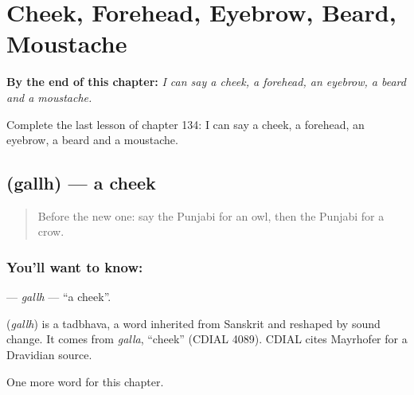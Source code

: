 
\chapter{Cheek, Forehead, Eyebrow, Beard, Moustache}
\label{ch:pa-cheek-forehead-eyebrow-beard-moustache}

\begin{chapteropening}
\textbf{By the end of this chapter:} \emph{I can say a cheek, a forehead, an eyebrow, a beard and a moustache.}

Complete the last lesson of chapter 134: I can say a cheek, a forehead, an eyebrow, a beard and a moustache.
\end{chapteropening}

\section[\texorpdfstring{\pa{ਗੱਲ੍ਹ} (gallh)}{ਗੱਲ੍ਹ (gallh)}]{ (gallh) — a cheek}

\label{lesson:PA-C134-gallh}



\begin{quote}
Before the new one: say the Punjabi for an owl, then the Punjabi for a crow.
\end{quote}

\subsection*{You'll want to know: }
\textbf{} — \emph{gallh} — \textquotedblleft{}a cheek\textquotedblright{}.

\begin{cousinweb}
\textbf{} (\emph{gallh}) is a tadbhava, a word inherited from Sanskrit and reshaped by sound change. It comes from \emph{galla}, \textquotedblleft{}cheek\textquotedblright{} (CDIAL 4089). CDIAL cites Mayrhofer for a Dravidian source.
\end{cousinweb}

\begin{grammarlens}[title={What you've built}]
One more word for this chapter.
\end{grammarlens}

